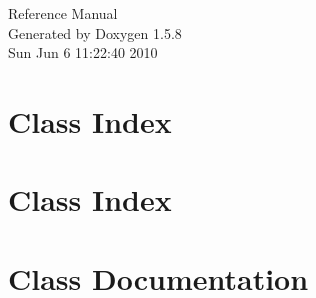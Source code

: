 \documentclass[a4paper]{book}
\begin{document}
\begin{titlepage}
\vspace*{7cm}
\begin{center}
{\Large Reference Manual}\\
\vspace*{1cm}
{\large Generated by Doxygen 1.5.8}\\
\vspace*{0.5cm}
{\small Sun Jun 6 11:22:40 2010}\\
\end{center}
\end{titlepage}
\clearemptydoublepage
{}
\tableofcontents
\clearemptydoublepage
{}
\chapter{Class Index}

\chapter{Class Index}

\chapter{Class Documentation}





































\printindex
\end{document}
